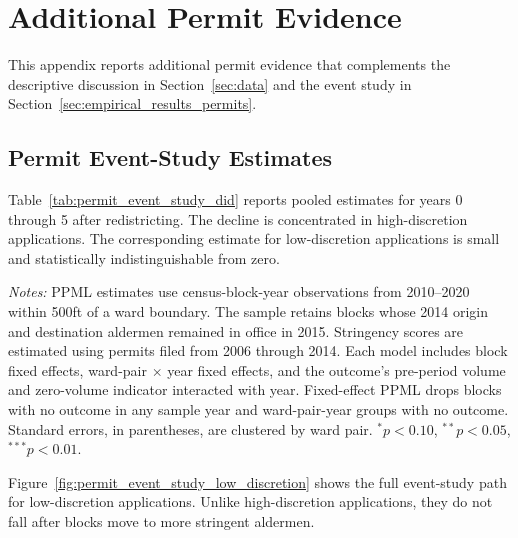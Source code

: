 
\section{Additional Permit Evidence}
\label{sec:appendix_permits}

This appendix reports additional permit evidence that complements the descriptive discussion in Section~\ref{sec:data} and the event study in Section~\ref{sec:empirical_results_permits}.

\subsection{Permit Event-Study Estimates}

Table~\ref{tab:permit_event_study_did} reports pooled estimates for years 0 through 5 after redistricting.
The decline is concentrated in high-discretion applications.
The corresponding estimate for low-discretion applications is small and statistically indistinguishable from zero.

\begin{table}[htbp]
    \centering
    \caption{Alderman Stringency and Permit Applications After Redistricting}
    \label{tab:permit_event_study_did}
    

    \footnotesize
    \textit{Notes:} PPML estimates use census-block-year observations from 2010--2020 within 500ft of a ward boundary.
    The sample retains blocks whose 2014 origin and destination aldermen remained in office in 2015.
    Stringency scores are estimated using permits filed from 2006 through 2014.
    Each model includes block fixed effects, ward-pair $\times$ year fixed effects, and the outcome's pre-period volume and zero-volume indicator interacted with year.
    Fixed-effect PPML drops blocks with no outcome in any sample year and ward-pair-year groups with no outcome.
    Standard errors, in parentheses, are clustered by ward pair.
    $^{*}p<0.10$, $^{**}p<0.05$, $^{***}p<0.01$.
\end{table}

Figure~\ref{fig:permit_event_study_low_discretion} shows the full event-study path for low-discretion applications.
Unlike high-discretion applications, they do not fall after blocks move to more stringent aldermen.

